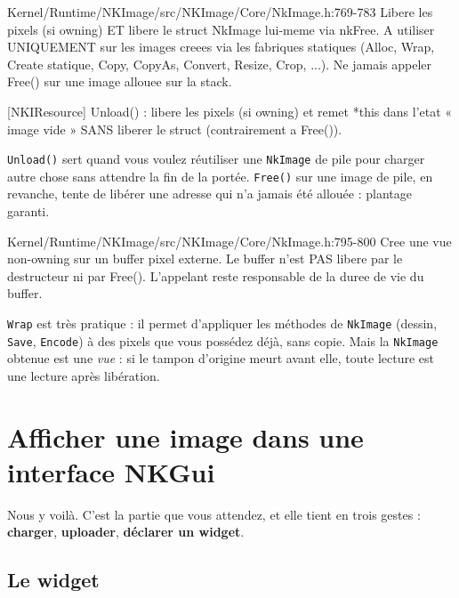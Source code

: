 \begin{nkcode}{Kernel/Runtime/NKImage/src/NKImage/Core/NkImage.h:769-783}
 Libere les pixels (si owning) ET libere le struct NkImage lui-meme via nkFree.
 A utiliser UNIQUEMENT sur les images creees via les fabriques statiques
 (Alloc, Wrap, Create statique, Copy, CopyAs, Convert, Resize, Crop, ...).
 Ne jamais appeler Free() sur une image allouee sur la stack.

 [NKIResource] Unload() : libere les pixels (si owning) et remet *this dans
 l'etat « image vide » SANS liberer le struct (contrairement a Free()).
\end{nkcode}

\texttt{Unload()} sert quand vous voulez réutiliser une \texttt{NkImage} de pile
pour charger autre chose sans attendre la fin de la portée. \texttt{Free()} sur
une image de pile, en revanche, tente de libérer une adresse qui n'a jamais été
allouée : plantage garanti.

\begin{nkpiege}
\begin{nkcode}{Kernel/Runtime/NKImage/src/NKImage/Core/NkImage.h:795-800}
 Cree une vue non-owning sur un buffer pixel externe.
 Le buffer n'est PAS libere par le destructeur ni par Free().
 L'appelant reste responsable de la duree de vie du buffer.
\end{nkcode}

\texttt{Wrap} est très pratique : il permet d'appliquer les méthodes de
\texttt{NkImage} (dessin, \texttt{Save}, \texttt{Encode}) à des pixels que vous
possédez déjà, sans copie. Mais la \texttt{NkImage} obtenue est une \emph{vue} :
si le tampon d'origine meurt avant elle, toute lecture est une lecture après
libération.
\end{nkpiege}

\section{Afficher une image dans une interface NKGui}

Nous y voilà. C'est la partie que vous attendez, et elle tient en trois gestes :
\textbf{charger}, \textbf{uploader}, \textbf{déclarer un widget}.

\subsection{Le widget}

